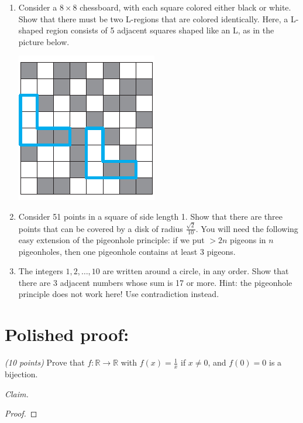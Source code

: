 \documentclass[12pt]{article}
\begin{document}
\begin{enumerate}
\begin{enumerate}

\item Consider a \( 8 \times 8 \) chessboard, with each square colored either black or white. Show that there must be two L-regions that are colored identically. Here, a L-shaped region consists of 5 adjacent squares shaped like an L, as in the picture below. \newline
\begin{center}
\includegraphics[scale=0.5]{L-shaped.png}
\end{center}


\item Consider 51 points in a square of side length 1. Show that there are three points that can be covered by a disk of radius \( \frac{\sqrt{2}}{10} \). You will need the following easy extension of the pigeonhole principle: if we put \( > 2n \) pigeons in \( n \) pigeonholes, then one pigeonhole contains at least 3 pigeons. \newline


\item The integers \( 1, 2, \dots, 10 \) are written around a circle, in any order. Show that there are 3 adjacent numbers whose sum is 17 or more. Hint: the pigeonhole principle does not work here! Use contradiction instead. \newline

\end{enumerate}



\end{enumerate}
\newpage %

\section*{Polished proof:} 

\emph{(10 points)} Prove that \( f : \mathbb{R} \to \mathbb{R} \) with \( f(x) = \frac{1}{x} \) if \( x \neq 0 \), and \( f(0) = 0 \) is a bijection.

\noindent \emph{Claim.}

\begin{proof}
\end{proof}
\end{document}
